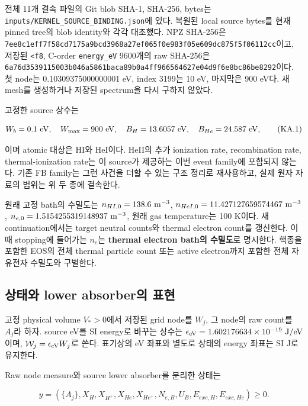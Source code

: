 \documentclass[11pt,a4paper]{article}
\begin{document}
전체 11개 결속 파일의 Git blob SHA-1, SHA-256, bytes는 \nolinkurl{inputs/KERNEL_SOURCE_BINDING.json}에 있다. 복원된 local source bytes를 현재 pinned tree의 blob identity와 각각 대조했다. NPZ SHA-256은 \nolinkurl{7ee8c1eff7f58cd7175a9bcd3968a27ef065f0e983f05e609dc875f5f06112cc}이고, 저장된 \texttt{\textless{}f8}, C-order \texttt{energy\_eV} 9600개의 raw SHA-256은 \nolinkurl{6a76d3539115003b046a5861baca89b0a4ff966564627e04d9f6e8bc86be8292}이다. 첫 node는 0.10309375000000001 eV, index 3199는 10 eV, 마지막은 900 eV다. 새 mesh를 생성하거나 저장된 spectrum을 다시 구하지 않았다.

고정한 source 상수는

\[
 W_b=0.1\ {\rm eV},\quad W_{\max}=900\ {\rm eV},\quad
 B_H=13.6057\ {\rm eV},\quad B_{He}=24.587\ {\rm eV},
 \tag{KA.1}
\]

이며 atomic 대상은 HI와 HeI이다. HeII의 추가 ionization rate, recombination rate, thermal-ionization rate는 이 source가 제공하는 이번 event family에 포함되지 않는다. 기존 FB family는 그런 사건을 더할 수 있는 구조 정리로 재사용하고, 실제 원자 자료의 범위는 위 두 종에 결속한다.

원래 고정 bath의 수밀도는 \(n_{HI,0}=138.6\ {\rm m}^{-3}\), \(n_{HeI,0}=11.427127659574467\ {\rm m}^{-3}\), \(n_{e,0}=1.5154255319148937\ {\rm m}^{-3}\), 원래 gas temperature는 100 K이다. 새 continuation에서는 target neutral counts와 thermal electron count를 갱신한다. 이때 stopping에 들어가는 \(n_e\)는 \textbf{thermal electron bath의 수밀도}로 명시한다. 핵종을 포함한 EOS의 전체 thermal particle count 또는 active electron까지 포함한 전체 자유전자 수밀도와 구별한다.

\hypertarget{uxc0c1uxd0dcuxc640-lower-absorberuxc758-uxd45cuxd604}{%
\subsection{상태와 lower absorber의 표현}\label{uxc0c1uxd0dcuxc640-lower-absorberuxc758-uxd45cuxd604}}

고정 physical volume \(V_*>0\)에서 저장된 grid node를 \(W_j\), 그 node의 raw count를 \(A_j\)라 하자. source eV를 SI energy로 바꾸는 상수는 \(\epsilon_{\rm eV}=1.602176634\times10^{-19}\ {\rm J/eV}\)이며, \(\mathcal W_j=\epsilon_{\rm eV}W_j\)로 쓴다. 표기상의 eV 좌표와 별도로 상태의 energy 좌표는 SI J로 유지한다.

Raw node measure와 source lower absorber를 분리한 상태는

\[
 y=(\{A_j\},X_H,X_{H^+},X_{He},X_{He^+},N_{e,B},U_B,
                   E_{exc,H},E_{exc,He})\ge0.
 \tag{KA.2}
\]
\end{document}
